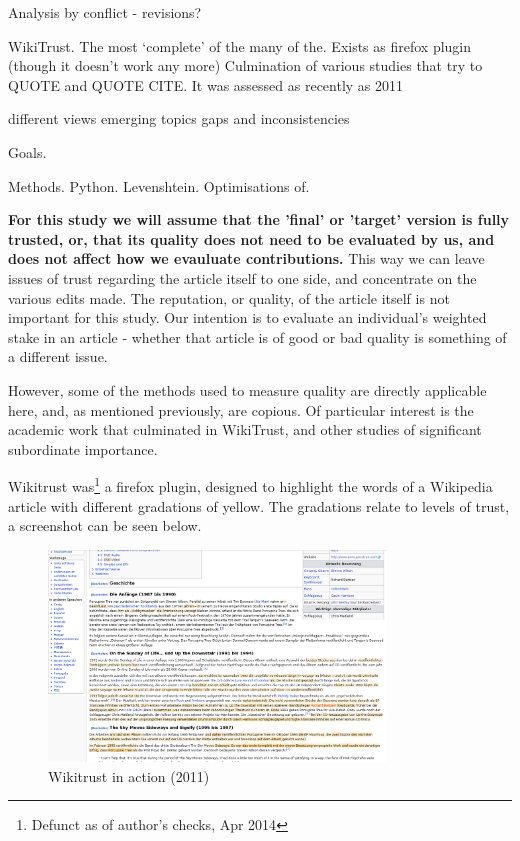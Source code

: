 \documentclass[a4paper,11pt,twoside,notitlepage]{article}
\begin{document}
        Analysis by conflict - revisions?\cite{Kittur2007}

        WikiTrust. The most `complete' of the many of the. Exists as
        firefox plugin (though it doesn't work any more) Culmination
        of various studies that try to QUOTE \cite{Adler2007} and QUOTE CITE. It
        was assessed as recently as 2011 \cite{Lucassen2011}
       
        different views emerging topics gaps and inconsistencies

        Goals.

        Methods. Python. Levenshtein. Optimisations of.
     
        \textbf{For this study we will assume that the 'final' or
          'target' version is fully trusted, or, that its quality does
          not need to be evaluated by us, and does not affect how we
          evauluate contributions.} This way we can leave issues of
        trust regarding the article itself to one side, and
        concentrate on the various edits made. The reputation, or
        quality, of the article itself is not important for this
        study. Our intention is to evaluate an individual's weighted
        stake in an article - whether that article is of good or bad
        quality is something of a different issue.

        However, some of the methods used to measure quality are
        directly applicable here, and, as mentioned previously, are
        copious. Of particular interest is the academic work that
        culminated in WikiTrust,\cite{Adler2006}\cite{Adler2007} and
        other studies of significant subordinate
        importance.\cite{Zeng2006}\cite{Cross2006}

        Wikitrust was\footnote{Defunct as of author's checks, Apr
          2014} a firefox plugin, designed to highlight the
        words of a Wikipedia article with different gradations of
        yellow. The gradations relate to levels of trust, a screenshot
        can be seen below.
        
       \begin{figure}
         \centering
         \includegraphics[width=0.8\textwidth,clip=true,resolution=300]{img/wikitrust.png}
         \caption{Wikitrust in action (2011)}
         \label{fig:wikitrust}
       \end{figure}
\end{document}
